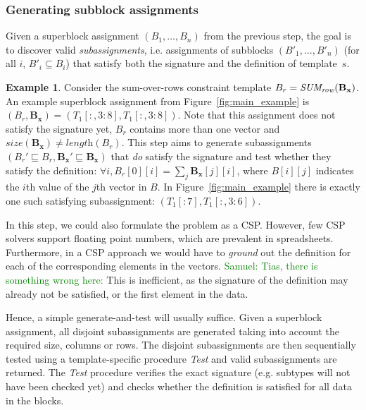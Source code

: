 \documentclass{IEEEtran}
\newcommand{\samuel}[1]{\textcolor{green}{{\sc Samuel:} #1}\xspace}
\newcommand{\format}[1]{\textit{#1}\xspace}
\newcommand{\findassignment}{\format{Subassignments}}
\newcommand{\sname}{\format{TaCLe}}
\newcommand{\range}[3]{\ensuremath{#1[#2,#3]}}
\newcommand{\rangeto}[2]{#1{:}#2}
\newcommand{\rangeall}{:}
\newcommand{\eccalc}[2]{\ensuremath{#1 = #2}}
\newcommand{\ecsumr}[2]{\eccalc{#1}{\textit{SUM\textsubscript{row}}(#2)}}
\newcommand{\plength}{\format{length}}
\newcommand{\psize}{\format{size}}
\newcommand{\sg}{B}
\theoremstyle{definition}
\newtheorem{example}{Example}
\begin{document}
\subsubsection{Generating subblock assignments}
\label{sec:algo:subgr}
Given a superblock assignment $(B_1, \dots, B_n)$ from the previous step, the goal is to discover valid \textit{subassignments}, i.e. assignments of subblocks $(B'_1, \dots, B'_n)$ (for all $i$, $B'_i \subseteq B_i$) that satisfy both the signature and the definition of template~$s$.

\begin{example}
  Consider the sum-over-rows constraint template $\ecsumr{\sg_r}{\mathbf{\sg_x}}$.
  An example superblock assignment from Figure~\ref{fig:main_example} is $(B_r, \mathbf{\sg_x}) = (\range{T_1}{\rangeall}{\rangeto{3}{8}}, \range{T_1}{\rangeall}{\rangeto{3}{8}})$.
  Note that this assignment does not satisfy the signature yet, $\sg_r$ contains more than one vector and $\psize(\mathbf{\sg_x}) \neq \plength(B_r)$.
  This step aims to generate subassignments $(B_r' \sqsubseteq B_r, \mathbf{B_x}' \sqsubseteq \mathbf{B_x})$ that \textit{do} satisfy the signature and test whether they satisfy the definition: $\forall i, \sg_r[0][i] = \sum_j \mathbf{\sg_x}[j][i]$, where $B[i][j]$ indicates the $i$th value of the $j$th vector in $B$.
  In Figure~\ref{fig:main_example} there is exactly one such satisfying subassignment: $(T_1[:7], T_1[:,3:6])$.
\end{example}

In this step, we could also formulate the problem as a CSP. %
However, few CSP solvers support floating point numbers, which are prevalent in spreadsheets.
Furthermore, in a CSP approach we would have to \textit{ground} out the definition for each of the corresponding elements in the vectors.
\samuel{Tias, there is something wrong here:}
This is inefficient, as the signature of the definition may already not be satisfied, or the first element in the data.

Hence, a simple generate-and-test will usually suffice.
Given a superblock assignment, all disjoint subassignments are generated taking into account the required size, columns or rows.
The disjoint subassignments are then sequentially tested using a template-specific procedure \textit{Test} and valid subassignments are returned.
The \textit{Test} procedure verifies the exact signature (e.g. subtypes will not have been checked yet) and checks whether the definition is satisfied for all data in the blocks.
\end{document}
